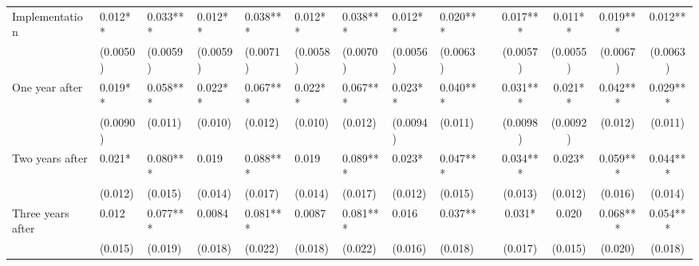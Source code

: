 \begin{tabular}{lccccrrrrrcccc}
Implementation & \multicolumn{1}{l}{0.012**} & \multicolumn{1}{l}{0.033***} & \multicolumn{1}{l}{0.012**} & \multicolumn{1}{l}{0.038***} & \multicolumn{1}{l}{0.012**} & \multicolumn{1}{l}{0.038***} & \multicolumn{1}{l}{0.012**} & \multicolumn{1}{l}{0.020***} &       & 0.017*** & 0.011** & 0.019*** & 0.012** \\
      & \multicolumn{1}{l}{(0.0050)} & \multicolumn{1}{l}{(0.0059)} & \multicolumn{1}{l}{(0.0059)} & \multicolumn{1}{l}{(0.0071)} & \multicolumn{1}{l}{(0.0058)} & \multicolumn{1}{l}{(0.0070)} & \multicolumn{1}{l}{(0.0056)} & \multicolumn{1}{l}{(0.0063)} &       & (0.0057) & (0.0055) & (0.0067) & (0.0063) \\
One year after & \multicolumn{1}{l}{0.019**} & \multicolumn{1}{l}{0.058***} & \multicolumn{1}{l}{0.022**} & \multicolumn{1}{l}{0.067***} & \multicolumn{1}{l}{0.022**} & \multicolumn{1}{l}{0.067***} & \multicolumn{1}{l}{0.023**} & \multicolumn{1}{l}{0.040***} &       & 0.031*** & 0.021** & 0.042*** & 0.029*** \\
      & \multicolumn{1}{l}{(0.0090)} & \multicolumn{1}{l}{(0.011)} & \multicolumn{1}{l}{(0.010)} & \multicolumn{1}{l}{(0.012)} & \multicolumn{1}{l}{(0.010)} & \multicolumn{1}{l}{(0.012)} & \multicolumn{1}{l}{(0.0094)} & \multicolumn{1}{l}{(0.011)} &       & (0.0098) & (0.0092) & (0.012) & (0.011) \\
Two years after & \multicolumn{1}{l}{0.021*} & \multicolumn{1}{l}{0.080***} & \multicolumn{1}{l}{0.019} & \multicolumn{1}{l}{0.088***} & \multicolumn{1}{l}{0.019} & \multicolumn{1}{l}{0.089***} & \multicolumn{1}{l}{0.023*} & \multicolumn{1}{l}{0.047***} &       & 0.034*** & 0.023* & 0.059*** & 0.044*** \\
      & \multicolumn{1}{l}{(0.012)} & \multicolumn{1}{l}{(0.015)} & \multicolumn{1}{l}{(0.014)} & \multicolumn{1}{l}{(0.017)} & \multicolumn{1}{l}{(0.014)} & \multicolumn{1}{l}{(0.017)} & \multicolumn{1}{l}{(0.012)} & \multicolumn{1}{l}{(0.015)} &       & (0.013) & (0.012) & (0.016) & (0.014) \\
Three years after & \multicolumn{1}{l}{0.012} & \multicolumn{1}{l}{0.077***} & \multicolumn{1}{l}{0.0084} & \multicolumn{1}{l}{0.081***} & \multicolumn{1}{l}{0.0087} & \multicolumn{1}{l}{0.081***} & \multicolumn{1}{l}{0.016} & \multicolumn{1}{l}{0.037**} &       & 0.031* & 0.020 & 0.068*** & 0.054*** \\
      & \multicolumn{1}{l}{(0.015)} & \multicolumn{1}{l}{(0.019)} & \multicolumn{1}{l}{(0.018)} & \multicolumn{1}{l}{(0.022)} & \multicolumn{1}{l}{(0.018)} & \multicolumn{1}{l}{(0.022)} & \multicolumn{1}{l}{(0.016)} & \multicolumn{1}{l}{(0.018)} &       & (0.017) & (0.015) & (0.020) & (0.018) \\

\end{tabular}
